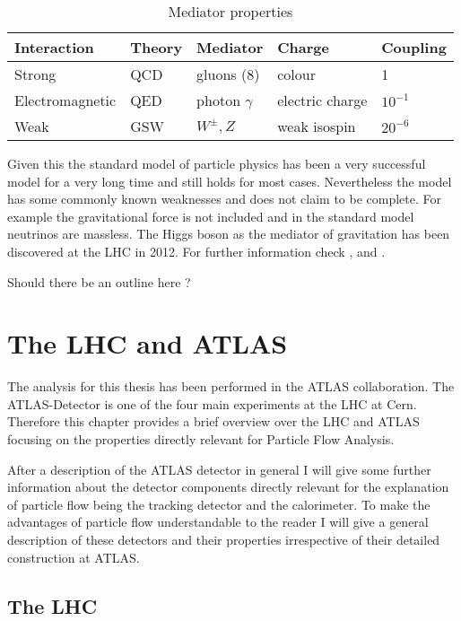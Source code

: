 \begin{table}[h]
\centering
\caption{Mediator properties}
\label{mediator properties}
\begin{tabular}{|l|l|l|l|l|}
\hline
Interaction     & Theory & Mediator        & Charge          & Coupling  \\ \hline
Strong          & QCD    & gluons (8)      & colour          & 1         \\ \hline
Electromagnetic & QED    & photon $\gamma$ & electric charge & $10^{-1}$ \\ \hline
Weak            & GSW    & $W^{\pm}, Z$    & weak isospin    & $20^{-6}$ \\ \hline
\end{tabular}
\end{table}

Given this the standard model of particle physics has been a very successful model for a very long time and still holds for most cases.
Nevertheless the model has some commonly known weaknesses and does not claim to be complete. For example the gravitational force is not included and in the standard model neutrinos are massless.
The Higgs boson as the mediator of gravitation has been discovered at the LHC in 2012. 
For further information check \cite{griffith08}, \cite{thomson13} and \cite{brock11}.

Should there be an outline here ? 
\newpage





\section{The LHC and ATLAS}

The analysis for this thesis has been performed in the ATLAS collaboration. The ATLAS-Detector is one of the four main experiments at the LHC at Cern. Therefore this chapter provides a brief overview over the LHC and ATLAS focusing on the properties directly relevant for Particle Flow Analysis.

After a description of the ATLAS detector in general I will give some further information about the detector components directly relevant for the explanation of particle flow being the tracking detector and the calorimeter. To make the advantages of particle flow understandable to the reader I will give a general description of these detectors and their properties irrespective of their detailed construction at ATLAS.

\subsection{The LHC}

